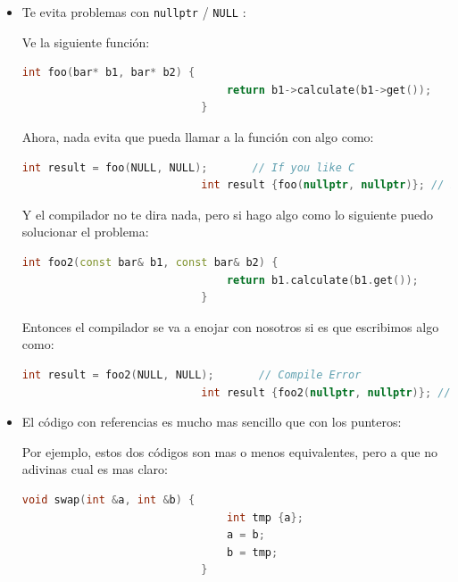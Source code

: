 \documentclass[12pt, fleqn]{report}                             %
\theoremstyle{break}                                            %
\newcommand{\textCode}[1]  { \texttt{#1} }                      %
\begin{document}
                \begin{itemize}
                    \item Te evita problemas con \textCode{nullptr} / \textCode{NULL}:

                        Ve la siguiente función:
                        \begin{lstlisting}[language=C++, gobble=28]
                            int foo(bar* b1, bar* b2) {
                                return b1->calculate(b1->get());
                            }
                        \end{lstlisting}

                        Ahora, nada evita que pueda llamar a la función con algo como:
                        \begin{lstlisting}[language=C++, gobble=28]
                            int result = foo(NULL, NULL);       // If you like C
                            int result {foo(nullptr, nullptr)}; // If you like C++
                        \end{lstlisting}

                        Y el compilador no te dira nada, pero si hago algo como lo siguiente puedo solucionar el
                        problema:
                        \begin{lstlisting}[language=C++, gobble=28]
                            int foo2(const bar& b1, const bar& b2) {
                                return b1.calculate(b1.get());
                            }
                        \end{lstlisting}

                        Entonces el compilador se va a enojar con nosotros si es que escribimos algo como:
                        \begin{lstlisting}[language=C++, gobble=28]
                            int result = foo2(NULL, NULL);       // Compile Error
                            int result {foo2(nullptr, nullptr)}; // Compile Error
                        \end{lstlisting}
                    
                    \item El código con referencias es mucho mas sencillo que con los punteros:

                        Por ejemplo, estos dos códigos son mas o menos equivalentes, pero a que no adivinas
                        cual es mas claro:
                        \begin{lstlisting}[language=C++, gobble=28]
                            void swap(int &a, int &b) {
                                int tmp {a};
                                a = b;
                                b = tmp;
                            }


\end{lstlisting}
\end{itemize}
\end{document}
